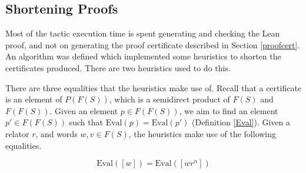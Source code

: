 \documentclass[11pt]{article} %
\theoremstyle{definition}
\theoremstyle{definition}
\theoremstyle{definition}
\theoremstyle{definition}
\theoremstyle{definition}
\theoremstyle{definition}
\begin{document}




\subsection{Shortening Proofs}

Most of the tactic execution time is spent generating and checking the Lean proof,
and not on generating the proof certificate described in Section \ref{proofcert}.
An algorithm was defined which implemented some heuristics to shorten the certificates
produced. There are two heuristics used to do this.

There are three equalities that the heuristics make use of. Recall that
a certificate is an element of $P(F(S))$, which is a semidirect product of $F(S)$
and $F(F(S))$. Given an element $p \in F(F(S))$, we aim to find an element
$p' \in F(F(S))$ such that $\text{Eval}(p) = \text{Eval}(p')$ (Definition \ref{Eval}).
Given a relator $r$, and words $w, v \in F(S)$, the heuristics make use of the following equalities.

\begin{equation}\label{golf1}
  \text{Eval}([w]) = \text{Eval}([wr^n])
\end{equation}
\end{document}
